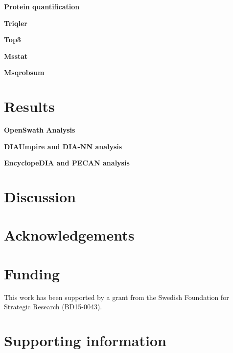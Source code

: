 \documentclass[10pt,letterpaper]{article}
\begin{document}
\textbf{Protein quantification}

\textbf{Triqler}

\textbf{Top3}

\textbf{Msstat}

\textbf{Msqrobsum}



\section*{Results}
\textbf{OpenSwath Analysis}

\textbf{DIAUmpire and DIA-NN analysis}

\textbf{EncyclopeDIA and PECAN analysis}


\section*{Discussion}

\section*{Acknowledgements}


\section*{Funding}

This work has been supported by a grant from the Swedish Foundation for Strategic Research (BD15-0043).

\section*{Supporting information}



\end{document}
